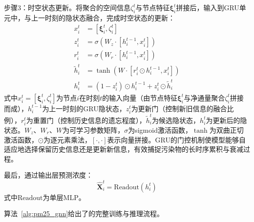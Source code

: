 步骤3：时空状态更新。将聚合的空间信息$\zeta_i^t$与节点特征$\boldsymbol{\xi}_i^t$拼接后，输入到GRU单元中，与上一时刻的隐状态融合，完成时空状态的更新：
\begin{equation}
\begin{aligned}
x_i^t &= [\boldsymbol{\xi}_i^t, \zeta_i^t] \\
z_i^t &= \sigma(W_z \cdot [h_i^{t-1}, x_i^t]) \\
r_i^t &= \sigma(W_r \cdot [h_i^{t-1}, x_i^t]) \\
\tilde{h}_i^t &= \tanh(W \cdot [r_i^t \odot h_i^{t-1}, x_i^t]) \\
h_i^t &= (1 - z_i^t) \odot h_i^{t-1} + z_i^t \odot \tilde{h}_i^t
\end{aligned}
\label{eq:grucell}
\end{equation}
\noindent 式中$x_i^t = [\boldsymbol{\xi}_i^t, \zeta_i^t]$为节点$i$在时刻$t$的输入向量（由节点特征$\boldsymbol{\xi}_i^t$与净通量聚合$\zeta_i^t$拼接而成），$h_i^{t-1}$为上一时刻的GRU隐状态，$z_i^t$为更新门（控制新旧信息的融合比例），$r_i^t$为重置门（控制历史信息的遗忘程度），$\tilde{h}_i^t$为候选隐状态，$h_i^t$为更新后的隐状态。$W_z$、$W_r$、$W$为可学习参数矩阵，$\sigma$为sigmoid激活函数，$\tanh$为双曲正切激活函数，$\odot$为逐元素乘法，$[\cdot, \cdot]$表示向量拼接。GRU的门控机制使模型能够自适应地选择保留历史信息还是更新新信息，有效捕捉污染物的长时序累积与衰减过程。

最后，通过输出层预测\PM 浓度：
\begin{equation}
    \hat{\mathbf{X}}_i^t = \text{Readout}(h_i^t)
\end{equation}
\noindent 式中$\text{Readout}$为单层MLP。

算法~\ref{alg:pm25_gnn}给出了\ModelPred{}的完整训练与推理流程。

